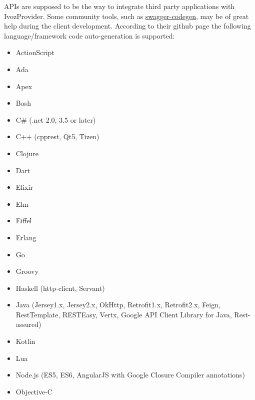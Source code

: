 \documentclass[letterpaper,10pt,english]{sphinxmanual}
\begin{document}
APIs are supposed to be the way to integrate third party applications with IvozProvider. Some community tools, such as
\href{https://github.com/swagger-api/swagger-codegen}{swagger-codegen}, may be of great help during the client development.
According to their github page the following language/framework code auto-generation is supported:
\begin{itemize}
\item {} 
ActionScript

\item {} 
Ada

\item {} 
Apex

\item {} 
Bash

\item {} 
C\# (.net 2.0, 3.5 or later)

\item {} 
C++ (cpprest, Qt5, Tizen)

\item {} 
Clojure

\item {} 
Dart

\item {} 
Elixir

\item {} 
Elm

\item {} 
Eiffel

\item {} 
Erlang

\item {} 
Go

\item {} 
Groovy

\item {} 
Haskell (http-client, Servant)

\item {} 
Java (Jersey1.x, Jersey2.x, OkHttp, Retrofit1.x, Retrofit2.x, Feign, RestTemplate, RESTEasy, Vertx, Google API Client Library for Java, Rest-assured)

\item {} 
Kotlin

\item {} 
Lua

\item {} 
Node.js (ES5, ES6, AngularJS with Google Closure Compiler annotations)

\item {} 
Objective-C


\end{itemize}
\end{document}
